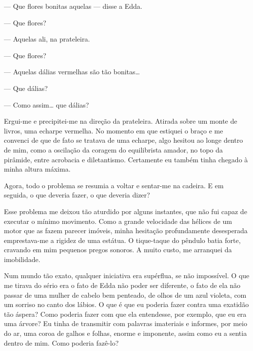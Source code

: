 --- Que flores bonitas aquelas --- disse a Edda.

--- Que flores?

--- Aquelas ali, na prateleira.

--- Que flores?

--- Aquelas dálias vermelhas são tão bonitas\ldots{}

--- Que dálias?

--- Como assim\ldots{} que dálias?

Ergui-me e precipitei-me na direção da prateleira. Atirada sobre um monte de
livros, uma echarpe vermelha. No momento em que estiquei o braço e me
convenci de que de fato se tratava de uma echarpe, algo hesitou ao longe
dentro de mim, como a oscilação da coragem do equilibrista amador, no topo da
pirâmide, entre acrobacia e diletantismo. Certamente eu também tinha chegado
à minha altura máxima.

Agora, todo o problema se resumia a voltar e sentar-me na cadeira. E em
seguida, o que deveria fazer, o que deveria dizer?

Esse problema me deixou tão aturdido por alguns instantes, que não fui capaz
de executar o mínimo movimento. Como a grande velocidade das hélices de um
motor que as fazem parecer imóveis, minha hesitação profundamente desesperada
emprestava-me a rigidez de uma estátua. O tique-taque do pêndulo batia forte,
cravando em mim pequenos pregos sonoros. A muito custo, me arranquei da
imobilidade. 


Num mundo tão exato, qualquer iniciativa era supérflua, se não impossível. O
que me tirava do sério era o fato de Edda não poder ser diferente, o fato de
ela não passar de uma mulher de cabelo bem penteado, de olhos de um azul
violeta, com um sorriso no canto dos lábios. O que é que eu poderia fazer
contra uma exatidão tão áspera? Como poderia fazer com que ela entendesse,
por exemplo, que eu era uma árvore? Eu tinha de transmitir com palavras
imateriais e informes, por meio do ar, uma coroa de galhos e folhas, enorme e
imponente, assim como eu a sentia dentro de mim. Como poderia fazê-lo?


